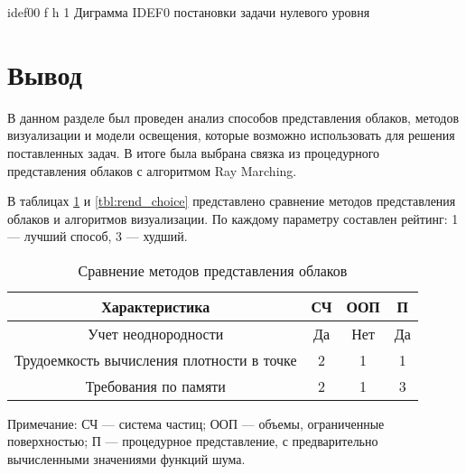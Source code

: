{idef00} %
{f} %
{h} %
{1\textwidth} %
{Диграмма IDEF0 постановки задачи нулевого уровня} %



\section*{Вывод}

В данном разделе был проведен анализ способов представления облаков, методов визуализации и модели освещения, которые возможно использовать для решения поставленных задач. В итоге была выбрана связка из процедурного представления облаков с алгоритмом Ray Marching.

В таблицах \ref{tbl:repr_choice} и \ref{tbl:rend_choice} представлено сравнение методов представления облаков и алгоритмов визуализации. По каждому параметру составлен рейтинг: 1 --- лучший способ, 3 --- худший.

\begin{table}[h]
	\begin{center}
		\begin{threeparttable}
			\captionsetup{justification=raggedright,singlelinecheck=off}
			\caption{Сравнение методов представления облаков}
			\label{tbl:repr_choice}
			\begin{tabular}{|c|c|c|c|}
				\hline
				Характеристика &  СЧ  & ООП & П \\
				\hline
				Учет неоднородности &  Да  & Нет & Да \\
				\hline
				Трудоемкость вычисления плотности в точке &  2  & 1 & 1 \\
				\hline
				Требования по памяти & 2 & 1 & 3 \\
				\hline
			\end{tabular}
			\begin{tablenotes}
				\small
				\item Примечание: СЧ --- система частиц; ООП --- объемы, ограниченные поверхностью; П --- процедурное представление, с предварительно вычисленными значениями функций шума.
			\end{tablenotes}
		\end{threeparttable}
	\end{center}
\end{table}

